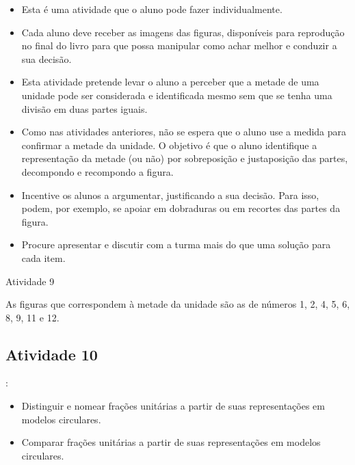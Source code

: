 \begin{multicols}{2}
  \begin{itemize} %
  \item       Esta é uma atividade que o aluno pode fazer individualmente.
  \item       Cada aluno deve receber as imagens das figuras, disponíveis para reprodução no final do livro para que possa manipular como achar melhor e conduzir a sua decisão.
  \item       Esta atividade pretende levar o aluno a perceber que a metade de uma unidade pode ser considerada e identificada mesmo sem que se tenha uma divisão em duas partes iguais.
  \item       Como nas atividades anteriores, não se espera que o aluno use a medida para confirmar a metade da unidade. O objetivo é que o aluno identifique a representação da metade (ou não) por sobreposição e justaposição das partes, decompondo e recompondo a figura.
  \item       Incentive os alunos a argumentar, justificando a sua decisão. Para isso, podem, por exemplo, se apoiar em dobraduras ou em recortes das partes da figura.
  \item       Procure apresentar e discutir com a turma mais do que uma solução para cada item.
\end{itemize} %

\begin{resposta*}{Atividade 9}

  As figuras que correspondem à metade da unidade são as de números 1, 2, 4, 5, 6, 8, 9, 11 e 12.
\end{resposta*}

\subsection{Atividade 10}

:
\begin{itemize}
 \item Distinguir e nomear frações unitárias a partir de suas representações em modelos circulares.
\item  Comparar frações unitárias a partir de suas representações em modelos circulares.
\end{itemize}

 \vspace{.1cm}

 \vspace{.1cm}


\end{multicols}
